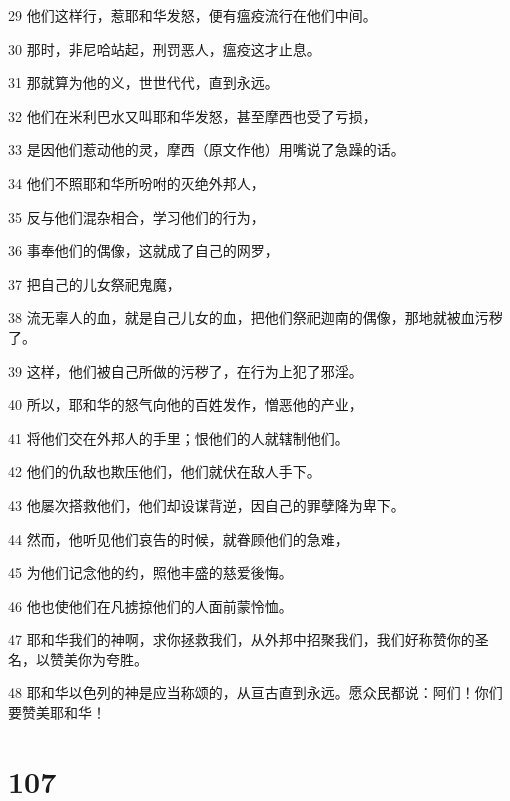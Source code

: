 \par 29 他们这样行，惹耶和华发怒，便有瘟疫流行在他们中间。
\par 30 那时，非尼哈站起，刑罚恶人，瘟疫这才止息。
\par 31 那就算为他的义，世世代代，直到永远。
\par 32 他们在米利巴水又叫耶和华发怒，甚至摩西也受了亏损，
\par 33 是因他们惹动他的灵，摩西（原文作他）用嘴说了急躁的话。
\par 34 他们不照耶和华所吩咐的灭绝外邦人，
\par 35 反与他们混杂相合，学习他们的行为，
\par 36 事奉他们的偶像，这就成了自己的网罗，
\par 37 把自己的儿女祭祀鬼魔，
\par 38 流无辜人的血，就是自己儿女的血，把他们祭祀迦南的偶像，那地就被血污秽了。
\par 39 这样，他们被自己所做的污秽了，在行为上犯了邪淫。
\par 40 所以，耶和华的怒气向他的百姓发作，憎恶他的产业，
\par 41 将他们交在外邦人的手里；恨他们的人就辖制他们。
\par 42 他们的仇敌也欺压他们，他们就伏在敌人手下。
\par 43 他屡次搭救他们，他们却设谋背逆，因自己的罪孽降为卑下。
\par 44 然而，他听见他们哀告的时候，就眷顾他们的急难，
\par 45 为他们记念他的约，照他丰盛的慈爱後悔。
\par 46 他也使他们在凡掳掠他们的人面前蒙怜恤。
\par 47 耶和华我们的神啊，求你拯救我们，从外邦中招聚我们，我们好称赞你的圣名，以赞美你为夸胜。
\par 48 耶和华以色列的神是应当称颂的，从亘古直到永远。愿众民都说：阿们！你们要赞美耶和华！

\chapter{107}


